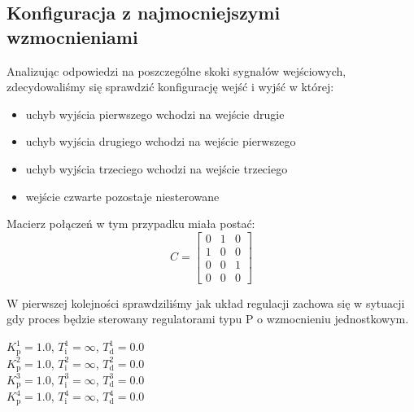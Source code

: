 \subsection{Konfiguracja z najmocniejszymi wzmocnieniami}
\label{pro_pid_konf1}

Analizując odpowiedzi na poszczególne skoki sygnałów wejściowych, zdecydowaliśmy się
sprawdzić konfigurację wejść i wyjść w której:\\

\begin{itemize}
    \item uchyb wyjścia pierwszego wchodzi na wejście drugie
    \item uchyb wyjścia drugiego wchodzi na wejście pierwszego
    \item uchyb wyjścia trzeciego wchodzi na wejście trzeciego
    \item wejście czwarte pozostaje niesterowane
\end{itemize}

\noindent Macierz połączeń w tym przypadku miała postać: \\

\[
C =
\begin{bmatrix}
    0 & 1 & 0 \\
    1 & 0 & 0 \\
    0 & 0 & 1 \\
    0 & 0 & 0 
\end{bmatrix}
\]

W pierwszej kolejności sprawdziliśmy jak układ regulacji zachowa się w 
sytuacji gdy proces będzie sterowany regulatorami typu P o wzmocnieniu 
jednostkowym.

\begin{center}
$K^{\num{1}}_{\mathrm{p}} = \num{1.0}$, $T^{\num{1}}_{\mathrm{i}} = \infty$, $T^{\num{1}}_{\mathrm{d}} = \num{0.0}$ \\
$K^{\num{2}}_{\mathrm{p}} = \num{1.0}$, $T^{\num{2}}_{\mathrm{i}} = \infty$, $T^{\num{2}}_{\mathrm{d}} = \num{0.0}$ \\
$K^{\num{3}}_{\mathrm{p}} = \num{1.0}$, $T^{\num{3}}_{\mathrm{i}} = \infty$, $T^{\num{3}}_{\mathrm{d}} = \num{0.0}$ \\
$K^{\num{4}}_{\mathrm{p}} = \num{1.0}$, $T^{\num{4}}_{\mathrm{i}} = \infty$, $T^{\num{4}}_{\mathrm{d}} = \num{0.0}$ \\
\end{center}


